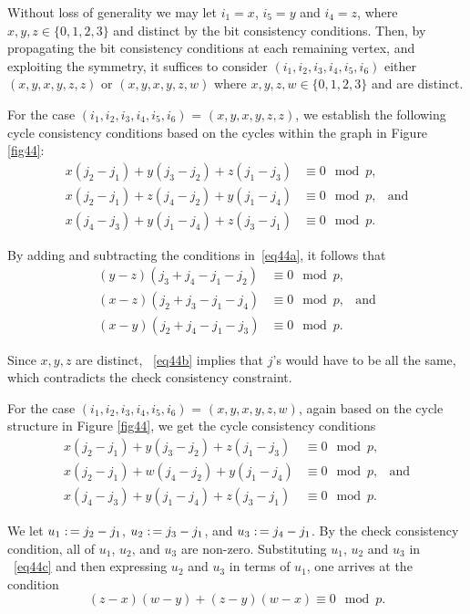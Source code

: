 Without loss of generality we may let $i_1=x$, $i_5=y$ and $i_4=z$,
where $x,y,z \in \{0,1,2,3\}$ and distinct by the bit consistency
conditions. Then, by propagating the bit consistency conditions at
each remaining vertex, and exploiting the symmetry, it suffices to
consider $(i_1,i_2,i_3,i_4,i_5,i_6)$ either $(x,y,x,y,z,z)$ or
$(x,y,x,y,z,w)$ where $x,y,z,w \in \{0,1,2,3 \}$ and are distinct.

For the case $(i_1,i_2,i_3,i_4,i_5,i_6)$ = $(x,y,x,y,z,z)$, we
establish the following cycle consistency conditions based on the
cycles within the graph in Figure \ref{fig44}:
\begin{equation}\label{eq44a}\begin{array}{ccccc}
x(j_2-j_1)+y(j_3-j_2)+z(j_1-j_3) & \equiv 0 \mod p,& \\
x(j_2-j_1)+z(j_4-j_2)+y(j_1-j_4) & \equiv 0 \mod p,&\text{and}\\
x(j_4-j_3)+y(j_1-j_4)+z(j_3-j_1) & \equiv 0 \mod p.&
\end{array}\end{equation}


By adding and subtracting the conditions in~\eqref{eq44a}, it
follows that
\begin{equation}\label{eq44b}\begin{array}{ccccc}
(y-z)(j_3+j_4-j_1-j_2) &\equiv 0 \mod p,&\\
(x-z)(j_2+j_3-j_1-j_4) &\equiv 0 \mod p,&\text{and}\\
(x-y)(j_2+j_4-j_1-j_3) &\equiv 0 \mod p.&
\end{array}\end{equation}

Since $x,y,z$ are distinct, ~\eqref{eq44b} implies that $j$'s would
have to be all the same, which contradicts the check consistency
constraint.

For the case $(i_1,i_2,i_3,i_4,i_5,i_6)$ = $(x,y,x,y,z,w)$, again
based on the cycle structure in Figure \ref{fig44}, we get the cycle
consistency conditions
\begin{equation}\label{eq44c}\begin{array}{ccccc}
x(j_2-j_1)+y(j_3-j_2)+z(j_1-j_3)& \equiv 0 \mod p,&{}\\
x(j_2-j_1)+w(j_4-j_2)+y(j_1-j_4)& \equiv 0 \mod p,&\text{and}\\
x(j_4-j_3)+y(j_1-j_4)+z(j_3-j_1)& \equiv 0 \mod p.&{}
\end{array}\end{equation}


We let $u_1 \asn j_2-j_1$, $u_2 \asn j_3-j_1$, and $u_3 \asn
j_4-j_1$. By the check consistency condition, all of $u_1$, $u_2$,
and $u_3$ are non-zero. Substituting $u_1$, $u_2$ and $u_3$ in
~\eqref{eq44c} and then expressing $u_2$ and $u_3$ in terms of
$u_1$, one arrives at the condition
\begin{equation}\label{eq23}
(z-x)(w-y)+(z-y)(w-x) \equiv 0 \mod p.
\end{equation}


